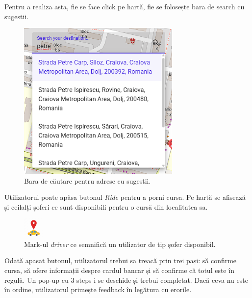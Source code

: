 Pentru a realiza asta, fie se face click pe hartă, fie se folosește bara de search cu sugestii.

\begin{figure}[H]
    \centering
    \includegraphics[width=8cm]{Assets/search.png}
    \caption{Bara de căutare pentru adrese cu sugestii.}
    \label{fig:searchAddress}
\end{figure}

Utilizatorul poate apăsa butonul \textit{Ride} pentru a porni cursa.
Pe hartă se afisează și ceilalți șoferi ce sunt disponibili pentru o cursă din localitatea sa.

\begin{figure}[H]
    \centering
    \includegraphics[width=1cm]{Assets/driver.png}
    \caption{Mark-ul \textit{driver} ce semnifică un utilizator de tip șofer disponibil.}
    \label{fig:driverPin}
\end{figure}

Odată apasat butonul, utilizatorul trebui sa treacă prin trei pași: să confirme cursa,
să ofere informații despre cardul bancar și să confirme că totul este în regulă. Un pop-up 
cu 3 steps i se deschide și trebui completat. Dacă ceva nu este în ordine, utilizatorul primește
feedback în legătura cu erorile.

